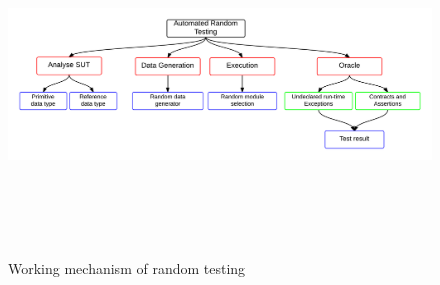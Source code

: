 \begin{figure}[h]
	\centering
	\centerline{\includegraphics[width=16.5cm, height=9cm ]{chapter2/randomTestingMechanism.png}}
	\caption{Working mechanism of random testing}
	\label{fig:workingmechanism}
\end{figure}

